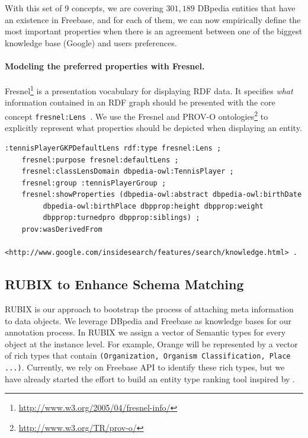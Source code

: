 \documentclass[onecolumn, crcready]{iosart2c}
\begin{document}
\begin{table}[!htp]
\end{table}\normalsize
With this set of 9 concepts, we are covering $301,189$ DBpedia entities that have an existence in Freebase, and for each of them, we can now empirically define the most important properties when there is an agreement between one of the biggest knowledge base (Google) and users preferences.

\paragraph{\textbf{Modeling the preferred properties with Fresnel.}}
\label{sec:fresnel}
Fresnel\footnote{\url{http://www.w3.org/2005/04/fresnel-info/}} is a presentation vocabulary for displaying RDF data. It specifies \textit{what} information contained in an RDF graph should be presented with the core concept \texttt{fresnel:Lens}~\cite{pietriga2006}. We use the Fresnel and PROV-O ontologies\footnote{\url{http://www.w3.org/TR/prov-o/}} to explicitly represent what properties should be depicted when displaying an entity.
\scriptsize
\begin{verbatim}
:tennisPlayerGKPDefaultLens rdf:type fresnel:Lens ;
	fresnel:purpose fresnel:defaultLens ;
	fresnel:classLensDomain dbpedia-owl:TennisPlayer ;
	fresnel:group :tennisPlayerGroup ;
	fresnel:showProperties (dbpedia-owl:abstract dbpedia-owl:birthDate
		 dbpedia-owl:birthPlace dbpprop:height dbpprop:weight
		 dbpprop:turnedpro dbpprop:siblings) ;
	prov:wasDerivedFrom
	  <http://www.google.com/insidesearch/features/search/knowledge.html> .		
\end{verbatim}	
\normalsize


\subsection{RUBIX to Enhance Schema Matching}

RUBIX is our approach to bootstrap the process of attaching meta information to data objects. We leverage DBpedia and Freebase as knowledge bases for our annotation process. In RUBIX we assign a vector of Semantic types for every object at the instance level. For example, Orange will be represented by a vector of rich types that contain \texttt{(Organization, Organism Classification, Place ...)}. Currently, we rely on Freebase API to identify these rich types, but we have already started the effort to build an entity type ranking tool inspired by \cite{TRank}. 
\end{document}
